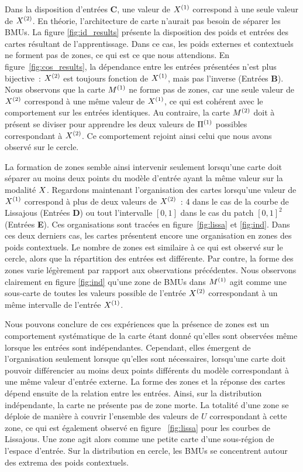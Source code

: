\documentclass[../main]{subfiles}
\begin{document}
Dans la disposition d'entrées \textbf{C}, une valeur de $X^{({1})}$ correspond à une seule valeur de $X^{({2})}$. En théorie, l'architecture de carte n'aurait pas besoin de séparer les BMUs. 
La figure \ref{fig:id_results} présente la disposition des poids et entrées des cartes résultant de l'apprentissage. Dans ce cas, les poids externes et contextuels ne forment pas de zones, ce qui est ce que nous attendions.
En figure~\ref{fig:cos_results}, la dépendance entre les entrées présentées n'est plus bijective~: $X^{({2})}$ est toujours fonction de $X^{({1})}$, mais pas l'inverse (Entrées \textbf{B}). 
Nous observons que la carte $M^{({1})}$ ne forme pas de zones, car une seule valeur de $X^{({2})}$ correspond à une même valeur de $X^{({1})}$, ce qui est cohérent avec le comportement sur les entrées identiques.
Au contraire, la carte $M^{({2})}$ doit à présent se diviser pour apprendre les deux valeurs de $\Pi^{({1})}$ possibles correspondant à $X^{({2})}$. Ce comportement rejoint ainsi celui que nous avons observé sur le cercle.

La formation de zones semble ainsi intervenir seulement lorsqu'une carte doit séparer au moins deux points du modèle d'entrée ayant la même valeur sur la modalité $X$.
Regardons maintenant l'organisation des cartes lorsqu'une valeur de $X^{({1})}$ correspond à plus de deux valeurs de $X^{({2})}$~: 4 dans le cas de la courbe de Lissajous (Entrées \textbf{D}) ou tout l'intervalle $[0,1]$ dans le cas du patch $[0,1]^2$ (Entrées \textbf{E}). 
Ces organisations sont tracées en figure~\ref{fig:lissa} et \ref{fig:ind}.
Dans ces deux derniers cas, les cartes présentent encore une organisation en zones des poids contextuels.
Le nombre de zones est similaire à ce qui est observé sur le cercle, alors que la répartition des entrées est différente. Par contre, la forme des zones varie légèrement par rapport aux observations précédentes.
Nous observons clairement en figure \ref{fig:ind} qu'une zone de BMUs dans $M^{({1})}$ agit comme une sous-carte de toutes les valeurs possible de l'entrée $X^{({2})}$ correspondant à un même intervalle de l'entrée  $X^{({1})}$.


Nous pouvons conclure de ces expériences que la présence de zones est un comportement systématique de la carte étant donné qu'elles sont observées même lorsque les entrées sont indépendantes. 
Cependant, elles émergent de l'organisation seulement lorsque qu'elles sont nécessaires, lorsqu'une carte doit pouvoir différencier au moins deux points différents du modèle correspondant à une même valeur d'entrée externe.
La forme des zones et la réponse des cartes dépend ensuite de la relation entre les entrées.
Ainsi, sur la distribution indépendante, la carte ne présente pas de zone morte. La totalité d'une zone se déploie de manière à couvrir l'ensemble des valeurs de $U$ correspondant à cette zone, ce qui est également observé en figure ~\ref{fig:lissa} pour les courbes de Lissajous. Une zone agit alors comme une petite carte d'une sous-région de l'espace d'entrée. Sur la distribution en cercle, les BMUs se concentrent autour des extrema des poids contextuels.
\end{document}
